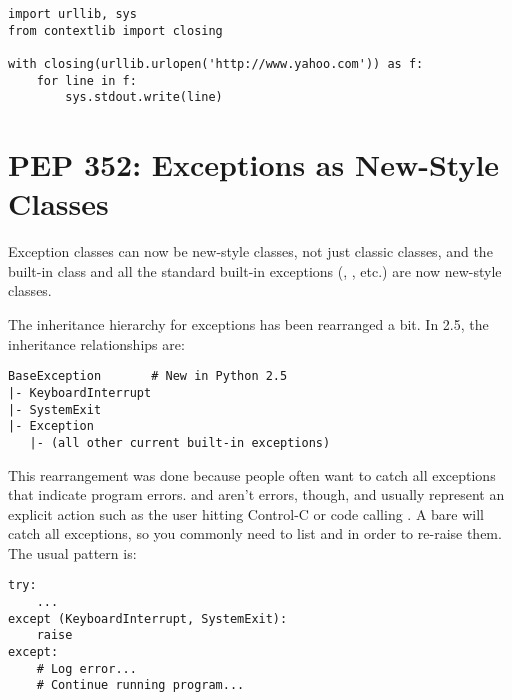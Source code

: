 \documentclass{howto}
\begin{document}
\begin{verbatim}
import urllib, sys
from contextlib import closing

with closing(urllib.urlopen('http://www.yahoo.com')) as f:
    for line in f:
        sys.stdout.write(line)
\end{verbatim}

\begin{seealso}



\end{seealso}


\section{PEP 352: Exceptions as New-Style Classes\label{pep-352}}

Exception classes can now be new-style classes, not just classic
classes, and the built-in  class and all the
standard built-in exceptions (,
, etc.) are now new-style classes.

The inheritance hierarchy for exceptions has been rearranged a bit.
In 2.5, the inheritance relationships are:

\begin{verbatim}
BaseException       # New in Python 2.5
|- KeyboardInterrupt
|- SystemExit
|- Exception
   |- (all other current built-in exceptions)
\end{verbatim}

This rearrangement was done because people often want to catch all
exceptions that indicate program errors.   and
 aren't errors, though, and usually represent an explicit
action such as the user hitting Control-C or code calling
.  A bare  will catch all exceptions,
so you commonly need to list  and
 in order to re-raise them.  The usual pattern is:

\begin{verbatim}
try:
    ...
except (KeyboardInterrupt, SystemExit):
    raise
except: 
    # Log error...  
    # Continue running program...
\end{verbatim}
\end{document}
